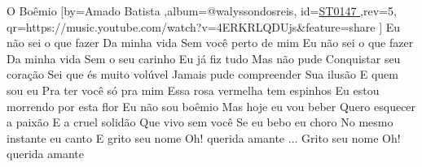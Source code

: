 \beginsong
{O Boêmio %
}[by={Amado Batista %
},album={@walyssondosreis},
id={\href{https://music.youtube.com/watch?v=4ERKRLQDUjs&feature=share %
}{ST0147 %
}},rev={5}, %
qr={https://music.youtube.com/watch?v=4ERKRLQDUjs&feature=share %
}]
\beginverse
Eu não sei o que fazer
Da minha vida
Sem você perto de mim
Eu não sei o que fazer
Da minha vida
Sem o seu carinho
\endverse
\beginverse
Eu já fiz tudo
Mas não pude
Conquistar seu coração
Sei que és muito volúvel
Jamais pude compreender
Sua ilusão
\endverse
\beginverse
E quem sou eu
Pra ter você só pra mim
Essa rosa vermelha tem espinhos
Eu estou morrendo por esta flor
\endverse
\beginverse
Eu não sou boêmio
Mas hoje eu vou beber
Quero esquecer a paixão
E a cruel solidão
Que vivo sem você
\endverse
\beginverse
Se eu bebo eu choro
No mesmo instante eu canto
E grito seu nome
Oh! querida amante
\endverse
{}
\beginverse
... Grito seu nome
Oh! querida amante
\endverse
\vspace{4em} %
\begin{comment}
\lstset{basicstyle=\scriptsize\bf} %
\tab{Solo 1}
\begin{lstlisting}
E|-----------------------------------------------------|
B|-----------------------------------------------------|
G|-----------------------------------------------------|
D|-----------------------------------------------------|
A|-----------------------------------------------------|
E|-----------------------------------------------------|
\end{lstlisting}
\end{comment}
